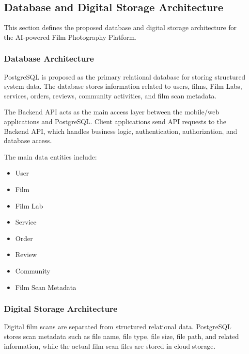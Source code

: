 
\subsection{Database and Digital Storage Architecture}

This section defines the proposed database and digital storage architecture
for the AI-powered Film Photography Platform.

\subsubsection{Database Architecture}

PostgreSQL is proposed as the primary relational database for storing
structured system data. The database stores information related to users,
films, Film Labs, services, orders, reviews, community activities, and
film scan metadata.

The Backend API acts as the main access layer between the mobile/web
applications and PostgreSQL. Client applications send API requests to the
Backend API, which handles business logic, authentication, authorization,
and database access.

The main data entities include:

\begin{itemize}
    \item User
    \item Film
    \item Film Lab
    \item Service
    \item Order
    \item Review
    \item Community
    \item Film Scan Metadata
\end{itemize}

\subsubsection{Digital Storage Architecture}

Digital film scans are separated from structured relational data.
PostgreSQL stores scan metadata such as file name, file type, file size,
file path, and related information, while the actual film scan files are
stored in cloud storage.

